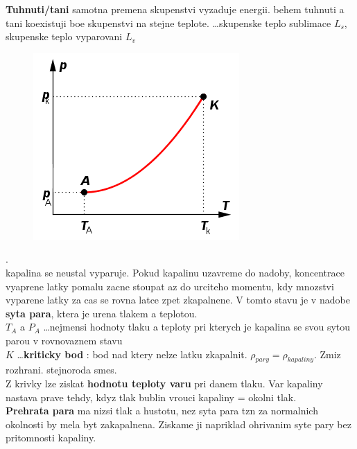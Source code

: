 \documentclass{report}
\begin{document}
\textbf{Tuhnuti/tani} samotna premena skupenstvi vyzaduje energii. behem tuhnuti a tani koexistuji boe skupenstvi na stejne teplote.
\ldots skupenske teplo sublimace $L_s$, skupenske teplo vyparovani $L_v$ \\

\vspace{-10pt}
\begin{figure}
  \includegraphics[width=\linewidth]{images/krivka_syte_pary.png}
\end{figure}%
.\vspace{10pt} \\
kapalina se neustal vyparuje. Pokud kapalinu uzavreme do nadoby, koncentrace vyaprene latky pomalu zacne stoupat az do urciteho momentu, kdy mnozstvi vyparene latky za cas se rovna latce zpet zkapalnene. V tomto stavu je v nadobe \textbf{syta para}, ktera je urena tlakem a teplotou. \\[10pt]
$T_A$ a  $P_A$  \ldots nejmensi hodnoty tlaku a teploty pri kterych je kapalina se svou sytou parou v rovnovaznem stavu \\[10pt] 
$K$ \ldots \textbf{kriticky bod} : bod nad ktery nelze latku zkapalnit. $\rho_{pary}=\rho_{kapaliny}$. Zmiz rozhrani. stejnoroda smes. \\[10pt]
Z krivky lze ziskat \textbf{hodnotu teploty varu} pri danem tlaku. Var kapaliny nastava prave tehdy, kdyz tlak bublin vrouci kapaliny = okolni tlak. \\[10pt]
\textbf{Prehrata para} ma nizsi tlak a hustotu, nez syta para tzn za normalnich okolnosti by mela byt zakapalnena. Ziskame ji napriklad ohrivanim syte pary bez pritomnosti kapaliny. \\
\end{document}
